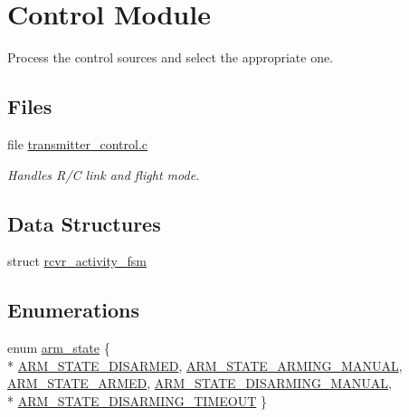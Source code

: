 \hypertarget{group___control_module}{\section{Control Module}
\label{group___control_module}
}


Process the control sources and select the appropriate one.  


\subsection*{Files}
\begin{DoxyCompactItemize}
\item 
file \hyperlink{transmitter__control_8c}{transmitter\-\_\-control.\-c}
\begin{DoxyCompactList}\small\item\em Handles R/\-C link and flight mode. \end{DoxyCompactList}\end{DoxyCompactItemize}
\subsection*{Data Structures}
\begin{DoxyCompactItemize}
\item 
struct \hyperlink{structrcvr__activity__fsm}{rcvr\-\_\-activity\-\_\-fsm}
\end{DoxyCompactItemize}
\subsection*{Enumerations}
\begin{DoxyCompactItemize}
\item 
enum \hyperlink{group___control_module_gabc93537d93556a29eb5f2bcaaeaddb34}{arm\-\_\-state} \{ \\*
\hyperlink{group___control_module_ggabc93537d93556a29eb5f2bcaaeaddb34a2f34987e2e81245760bad38d871bd766}{A\-R\-M\-\_\-\-S\-T\-A\-T\-E\-\_\-\-D\-I\-S\-A\-R\-M\-E\-D}, 
\hyperlink{group___control_module_ggabc93537d93556a29eb5f2bcaaeaddb34a70d0897e1119601f5e6fd4176e701603}{A\-R\-M\-\_\-\-S\-T\-A\-T\-E\-\_\-\-A\-R\-M\-I\-N\-G\-\_\-\-M\-A\-N\-U\-A\-L}, 
\hyperlink{group___control_module_ggabc93537d93556a29eb5f2bcaaeaddb34a5703b08b4383be1fc1f688336caa647c}{A\-R\-M\-\_\-\-S\-T\-A\-T\-E\-\_\-\-A\-R\-M\-E\-D}, 
\hyperlink{group___control_module_ggabc93537d93556a29eb5f2bcaaeaddb34ab917b0801c1092957516518b59fc7e60}{A\-R\-M\-\_\-\-S\-T\-A\-T\-E\-\_\-\-D\-I\-S\-A\-R\-M\-I\-N\-G\-\_\-\-M\-A\-N\-U\-A\-L}, 
\\*
\hyperlink{group___control_module_ggabc93537d93556a29eb5f2bcaaeaddb34ad5488ade89f8d979f76bbccb7bbd5993}{A\-R\-M\-\_\-\-S\-T\-A\-T\-E\-\_\-\-D\-I\-S\-A\-R\-M\-I\-N\-G\-\_\-\-T\-I\-M\-E\-O\-U\-T}
 \}
\end{DoxyCompactItemize}
